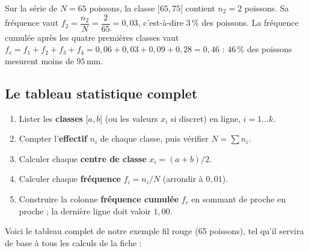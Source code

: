 \documentclass[11pt,a4paper]{article}
\begin{document}
\begin{exemple}
Sur la série de $N=65$ poissons, la classe $[65,75[$ contient $n_2=2$ poissons. Sa fréquence vaut
$f_2=\dfrac{n_2}{N}=\dfrac{2}{65}=0{,}03$, c'est-à-dire \textbf{$3\,\%$} des poissons.
La fréquence cumulée après les quatre premières classes vaut
$f_c=f_1+f_2+f_3+f_4=0{,}06+0{,}03+0{,}09+0{,}28=0{,}46$ : \textbf{$46\,\%$} des poissons mesurent
moins de $95$\,mm.
\end{exemple}

\subsection{Le tableau statistique complet}

\begin{commentfaire}
\begin{enumerate}[leftmargin=1.8em,topsep=2pt,itemsep=1pt]
  \item Lister les \textbf{classes} $[a,b[$ (ou les valeurs $x_i$ si discret) en ligne, $i=1\ldots k$.
  \item Compter l'\textbf{effectif} $n_i$ de chaque classe, puis vérifier $N=\sum n_i$.
  \item Calculer chaque \textbf{centre de classe} $x_i=(a+b)/2$.
  \item Calculer chaque \textbf{fréquence} $f_i=n_i/N$ (arrondir à $0{,}01$).
  \item Construire la colonne \textbf{fréquence cumulée} $f_c$ en sommant de proche en proche ;
        la dernière ligne doit valoir $1{,}00$.
\end{enumerate}
\end{commentfaire}

Voici le tableau complet de notre exemple fil rouge (65 poissons), tel qu'il servira de base à tous
les calculs de la fiche :
\end{document}
